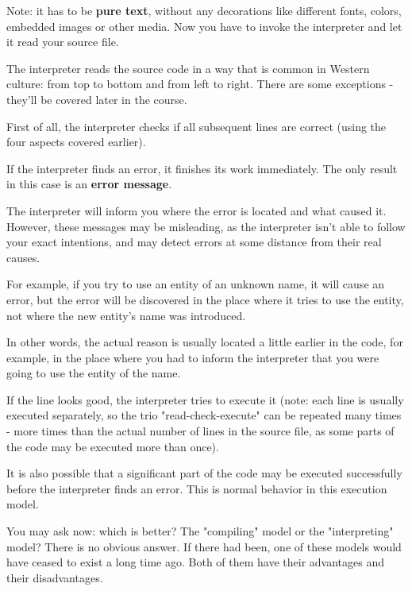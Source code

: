 \documentclass[a4paper,10pt]{article}
\begin{document}
Note: it has to be \textbf{pure text}, without any decorations like different fonts, colors, embedded images or other media. Now you have to invoke the interpreter and let it read your source file.
\newline

The interpreter reads the source code in a way that is common in Western culture: from top to bottom and from left to right. There are some exceptions - they'll be covered later in the course.
\newline

First of all, the interpreter checks if all subsequent lines are correct (using the four aspects covered earlier).
\newline

If the interpreter finds an error, it finishes its work immediately. The only result in this case is an \textbf{error message}.
\newline

The interpreter will inform you where the error is located and what caused it. However, these messages may be misleading, as the interpreter isn't able to follow your exact intentions, and may detect errors at some distance from their real causes.
\newline

For example, if you try to use an entity of an unknown name, it will cause an error, but the error will be discovered in the place where it tries to use the entity, not where the new entity's name was introduced.
\newline

In other words, the actual reason is usually located a little earlier in the code, for example, in the place where you had to inform the interpreter that you were going to use the entity of the name.
\newline

If the line looks good, the interpreter tries to execute it (note: each line is usually executed separately, so the trio "read-check-execute" can be repeated many times - more times than the actual number of lines in the source file, as some parts of the code may be executed more than once).
\newline

It is also possible that a significant part of the code may be executed successfully before the interpreter finds an error. This is normal behavior in this execution model.
\newline

You may ask now: which is better? The "compiling" model or the "interpreting" model? There is no obvious answer. If there had been, one of these models would have ceased to exist a long time ago. Both of them have their advantages and their disadvantages.
\newline
\end{document}
